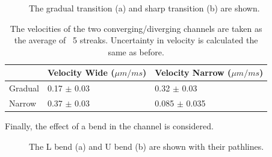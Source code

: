 \documentclass[12pt]{article}
\begin{document}
\begin{figure}[H]
    \centering
    \qquad
    \caption{The gradual transition (a) and sharp transition (b) are shown.}
    \label{fig:variable_width}
\end{figure}

\begin{table}[H]
    \begin{tabular}{|l|l|l|}
    \hline
     & Velocity Wide ($\mu m/ms$) & Velocity Narrow ($\mu m/ms$) \\ \hline
    Gradual & 0.17 $\pm$ 0.03 &  0.32 $\pm$ 0.03  \\ \hline
    Narrow & 0.37 $\pm$ 0.03 & 0.085 $\pm$  0.035 \\ \hline
    \end{tabular}
    \centering
    \label{Tab:part2_b}
    \caption{The velocities of the two converging/diverging channels are taken as the average of ~5 streaks. Uncertainty in velocity is calculated the same as before.}
\end{table}

Finally, the effect of a bend in the channel is considered.

\begin{figure}[H]
    \centering
    \qquad
    \caption{The L bend (a) and U bend (b) are shown with their pathlines.}
    \label{fig:bends}
\end{figure}
\end{document}
